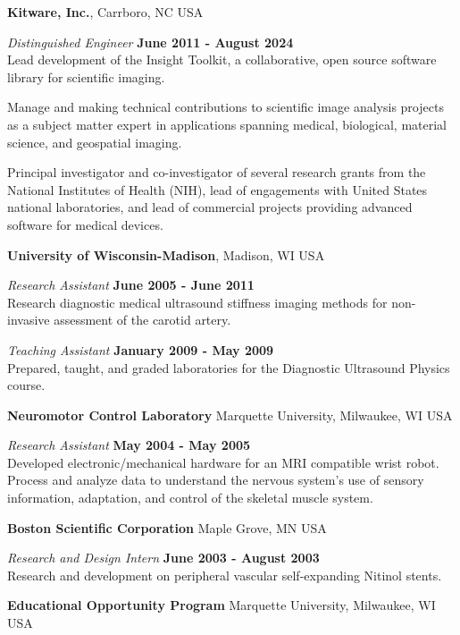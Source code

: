 \documentclass[margin,line]{res}
\begin{document}
\begin{resume}
{\bf Kitware, Inc.}, Carrboro, NC USA

\vspace{-.3cm}
{\em Distinguished Engineer} \hfill {\bf June 2011 - August 2024} \\
Lead development of the Insight Toolkit, a collaborative, open source software library for scientific imaging.

Manage and making technical contributions to scientific image analysis
projects as a subject matter expert in applications spanning medical, biological,
material science, and geospatial imaging.

Principal investigator and co-investigator of several research grants from
the National Institutes of Health (NIH), lead of engagements with United States
national laboratories, and lead of commercial projects providing advanced software
for medical devices.

{\bf University of Wisconsin-Madison}, Madison, WI USA

\vspace{-.3cm}
{\em Research Assistant} \hfill {\bf June 2005 - June 2011} \\
Research diagnostic medical ultrasound stiffness imaging methods for non-invasive assessment of the carotid artery.

\vspace{-.3cm}
{\em Teaching Assistant} \hfill {\bf January 2009 - May 2009} \\
Prepared, taught, and graded laboratories for the Diagnostic Ultrasound Physics
course.

{\bf Neuromotor Control Laboratory} Marquette University, Milwaukee, WI USA

\vspace{-.3cm}
{\em Research Assistant} \hfill {\bf May 2004 - May 2005} \\
Developed electronic/mechanical hardware for an MRI compatible
wrist robot.
Process and analyze data to understand the nervous system's use of sensory information, adaptation, and control of the skeletal muscle system.

{\bf Boston Scientific Corporation} Maple Grove, MN USA

\vspace{-.3cm}
{\em Research and Design Intern} \hfill {\bf June 2003 - August 2003} \\
Research and development on peripheral vascular self-expanding Nitinol stents.

{\bf Educational Opportunity Program} Marquette University, Milwaukee, WI USA


\end{resume}
\end{document}
